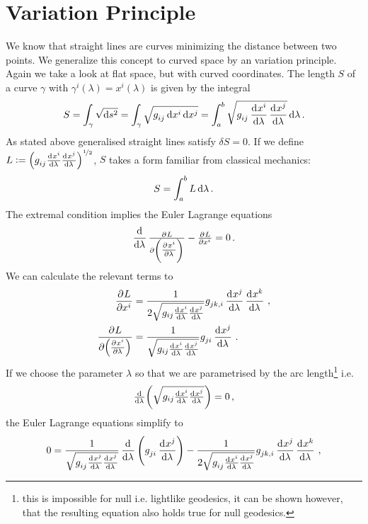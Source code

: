 \section{Variation Principle}
\label{sec:varprinc}
We know that straight lines are curves minimizing the distance between two
points. We generalize this concept to curved space by an variation principle.
Again we take a look at flat space, but with curved coordinates.
The length $S$ of a curve $\gamma$ with $\gamma^i(\lambda) = x^i(\lambda)$ is
given by the integral
\begin{equation}
    S=\int_{\gamma}\sqrt{\dif s^2} =
    \int_{\gamma}\sqrt{\tensor{g}{_i_j}\dif \tensor{x}{^i}\dif
    \tensor{x}{^j}}=\int_{a}^{b}\sqrt{\tensor{g}{_i_j}\dod{\tensor{x}{^i}}{\lambda}
    \dod{\tensor{x}{^j}}{\lambda}}\dif \lambda\, .
\end{equation}
As stated above generalised straight lines satisfy $\delta S = 0$. If we define
$L:=\left(\tensor{g}{_i_j}\od{\tensor{x}{^i}}{\lambda}
\od{\tensor{x}{^j}}{\lambda}\right)^{\nicefrac{1}{2}}$, $S$ takes a form
familiar from classical mechanics:
\begin{equation}
    S=\int_a^b L\dif \lambda\, .
\end{equation}
The extremal condition implies the Euler Lagrange equations
\begin{equation}
    \dod{}{\lambda}\pd{L}{\left(\pd{\tensor{x}{^i}}{\lambda}\right)}
    -\pd{L}{\tensor{x}{^i}}
    =0\, .		\end{equation}
We can calculate the relevant terms to 
\begin{align}
\dpd{L}{\tensor{x}{^i}}&=\frac{1}{2\sqrt{g_{ij}\od{x^i}{\lambda}
\od{x^j}{\lambda}}}\tensor{g}{_j_k_{,i}}\dod{x^j}{\lambda}
\dod{x^k}{\lambda}\,,\\
\dpd{L}{\left(\pd{\tensor{x}{^i}}{\lambda}\right)}
&=\frac{1}{\sqrt{g_{ij}\od{x^i}{\lambda}
\od{x^j}{\lambda}}}\tensor{g}{_j_i}\dod{x^j}{\lambda}\, .
\end{align}
If we choose the parameter $\lambda$ so that we are parametrised by the arc
length\footnote{this is impossible for null i.e. lightlike geodesics, it can be
shown however, that the resulting equation also holds true for null geodesics.}
i.e.
\begin{equation}
\od{}{\lambda}\left(\sqrt{g_{ij}\od{x^i}{\lambda}\od{x^j}{\lambda}}\right)=0\,,
\end{equation}
the Euler Lagrange equations simplify to
\begin{equation}
0=\frac{1}{\sqrt{\tensor{g}{_i_j}\od{\tensor{x}{^j}}{\lambda}
\od{\tensor{x}{^j}}{\lambda}}}\dod{}{\lambda}
\left(\tensor{g}{_j_i}\dod{\tensor{x}{^j}}{\lambda}\right)
-\frac{1}{2\sqrt{\tensor{g}{_i_j}\od{x^i}{\lambda}
\od{\tensor{x}{^j}}{\lambda}}}\tensor{g}{_j_k_{,i}}\dod{\tensor{x}{^j}}{\lambda}
\dod{\tensor{x}{^k}}{\lambda}\,,
\end{equation}
